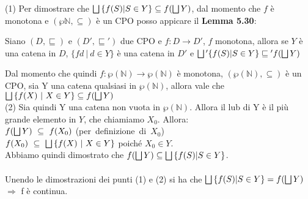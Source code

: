 {    (1) Per dimostrare che $\bigsqcup{} \{f(S) | S \in{}Y\} \subseteq{} 
    f(\bigsqcup{}Y)$, dal momento che $f$ è monotona e 
    $(\wp{\mathbb{N}}, \subseteq{})$ è un CPO posso appicare il 
    \textbf{Lemma 5.30}:\\
    \begin{customlem}{5.30}
    Siano $(D, \sqsubseteq)$ e $(D', \sqsubseteq{}')$ due CPO e 
    $f:D\rightarrow{}D'$, $f$ monotona, allora se $Y$ è una catena in $D$, 
    $\{fd~|~d\in{}Y\}$ è una catena in $D'$ e $\bigsqcup{}' \{f(S) | S \in{}Y\} 
    \sqsubseteq{}' f(\bigsqcup{}Y)$
    \end{customlem}
    Dal momento che quindi $f:\wp{(\mathbb{N})}\rightarrow{}\wp{(\mathbb{N})}$
    è monotona, $(\wp{(\mathbb{N})}, \subseteq)$ è un CPO, sia Y una catena
    qualsiasi in $\wp{(\mathbb{N})}$, allora vale che $\bigsqcup{}\{f(X)~|~X\in{}Y\}
    \subseteq{}f(\bigsqcup{}Y)$\\
    
    (2) Sia quindi Y una catena non vuota in $\wp{(\mathbb{N})}$. Allora il lub
    di Y è il più grande elemento in $Y$, che chiamiamo $X_0$. Allora:\\
    \hspace*{1.5cm}$f(\bigsqcup{}Y)~\subseteq~f(X_0)$ (per~definizione~di~$X_0$)\\
    \hspace*{1.5cm}$f(X_0)~\subseteq~\bigsqcup{}\{f(X)~|~X\in{}Y\}$ poiché $X_0\in{}
    Y$.\\
    Abbiamo quindi dimostrato che $f(\bigsqcup{}Y) \subseteq \bigsqcup{} \{f(S) | S
    \in{}Y\}$.\\ \\
    
    Unendo le dimostrazioni dei punti (1) e (2) si ha che $\bigsqcup{} \{f(S) | S
    \in{}Y\} = f(\bigsqcup{}Y)$ $\Rightarrow$ f è continua.

%
}
\newpage
